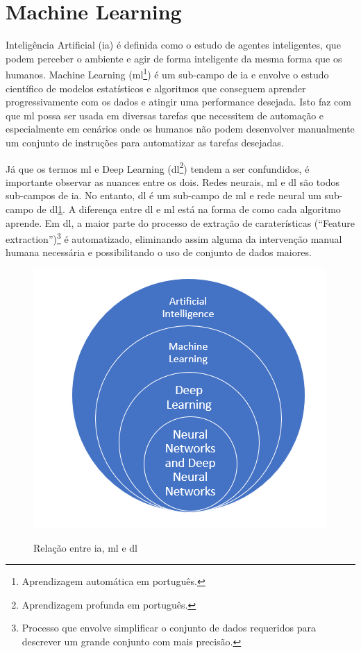 \section{Machine Learning}

Inteligência Artificial (\ac{ia}) é definida como o estudo de agentes inteligentes, que podem perceber o ambiente e agir de forma inteligente da mesma forma que os humanos.
Machine Learning (\ac{ml}\footnote{Aprendizagem automática em português.}) é um sub-campo de \ac{ia} e envolve o estudo científico de modelos estatísticos e algoritmos que conseguem aprender progressivamente com os dados e atingir uma performance desejada.
Isto faz com que \ac{ml} possa ser usada em diversas tarefas que necessitem de automação e especialmente em cenários onde os humanos não podem desenvolver manualmente um conjunto de instruções para automatizar as tarefas desejadas. 

Já que os termos \ac{ml} e Deep Learning (\ac{dl}\footnote{Aprendizagem profunda em português.}) tendem a ser confundidos, é importante observar as nuances entre os dois. Redes neurais, \ac{ml} e \ac{dl} são todos sub-campos de \ac{ia}. No entanto, \ac{dl} é um sub-campo de \ac{ml} e rede neural um sub-campo de \ac{dl}\ref{relation}. A diferença entre \ac{dl} e \ac{ml} está na forma de como cada algoritmo aprende. Em \ac{dl}, a maior parte do processo de extração de caraterísticas (``Feature extraction'')\footnote{Processo que envolve simplificar o conjunto de dados requeridos para descrever um grande conjunto com mais precisão.} é automatizado, eliminando assim alguma da intervenção manual humana necessária e possibilitando o uso de conjunto de dados maiores. \cite{MLIBM}




\begin{figure}[H]
\centering
\includegraphics[scale=0.6]{figs/ai_relationship}
\caption{Relação entre \ac{ia}, \ac{ml} e \ac{dl} }\cite{imagemRelation}\label{relation}
\end{figure}



